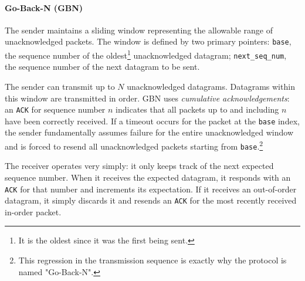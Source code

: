 \paragraph{Go-Back-N (GBN)}
The sender maintains a sliding window representing the allowable range of unacknowledged packets. The window is defined by two primary pointers: \texttt{base}, the sequence number of the oldest\footnote{It is the oldest since it was the first being sent.} unacknowledged datagram; \texttt{next\_seq\_num}, the sequence number of the next datagram to be sent.

The sender can transmit up to \( N \) unacknowledged datagrams. Datagrams within this window are transmitted in order.
GBN uses \emph{cumulative acknowledgements}: an \texttt{ACK} for sequence number \( n \) indicates that all packets up to and including \( n \) have been correctly received.
If a timeout occurs for the packet at the \texttt{base} index, the sender fundamentally assumes failure for the entire unacknowledged window and is forced to resend all unacknowledged packets starting from \texttt{base}.\footnote{This regression in the transmission sequence is exactly why the protocol is named "Go-Back-N".}

The receiver operates very simply: it only keeps track of the next expected sequence number. When it receives the expected datagram, it responds with an \texttt{ACK} for that number and increments its expectation. If it receives an out-of-order datagram, it simply discards it and resends an \texttt{ACK} for the most recently received in-order packet.

